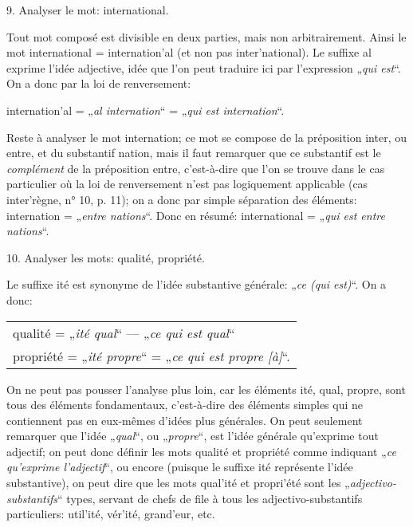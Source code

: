 {    9. Analyser le mot: \textup{international}.

    Tout mot composé est divisible en deux parties, mais non
    arbitrairement. Ainsi le mot \textup{international} = \textup{
      internation’al} (et non pas \textup{inter’national}). Le suffixe
    \textup{al} exprime l’idée adjective, idée que l’on peut traduire ici par
    l’expression „\emph{qui est}“. On a donc par la loi de renversement:

    {\centering
      \textup{internation’al} = „\emph{al internation}“ = „\emph{qui
        est internation}“.
      \par}
    \noindent
    Reste à analyser le mot \textup{internation}; ce mot se compose de
    la préposition \textup{inter}, ou \textup{entre}, et du substantif
    \textup{nation}, mais il faut remarquer que ce substantif est le
    \emph{complément} de la préposition \textup{entre}, c’est-à-dire
    que l’on se trouve dans le cas particulier où la loi de
    renversement n’est pas logiquement applicable (cas
    \textup{inter'règne}, n° 10, p. 11); on a donc par simple
    séparation des éléments: \textup{internation} = „\emph{entre
      nations}“. Donc en résumé: \textup{international} = „\emph{qui
      est entre nations}“.

    10. Analyser les mots: \textup{qualité}, \textup{propriété}.

    Le suffixe \textup{ité} est synonyme de l’idée substantive
    générale: „\emph{ce (qui est)}“. On a donc:

    {\centering
      \begin{tabular}[t]{l}
        \textup{qualité} = „\emph{ité qual}“ — „\emph{ce qui est
        qual}“\\
        \textup{propriété} = „\emph{ité propre}“ = „\emph{ce qui est propre [à]}“.
      \end{tabular}
      \par}


    On ne peut pas pousser l’analyse plus loin, car les éléments
    \textup{ité}, \textup{qual}, \textup{propre}, sont tous des
    éléments fondamentaux, c’est-à-dire des éléments simples qui ne
    contiennent pas en eux-mêmes d’idées plus générales. On peut
    seulement remarquer que l’idée „\emph{qual}“, ou „\emph{propre}“,
    est l’idée générale qu’exprime tout adjectif; on peut donc définir
    les mots \textup{qualité} et \textup{propriété} comme indiquant
    „\emph{ce qu'exprime l'adjectif}“, ou encore (puisque le suffixe
    \textup{ité} représente l’idée substantive), on peut dire que les
    mots \textup{qual'ité} et \textup{propri'été} sont les
    „\emph{adjectivo-substantifs}“ types, servant de chefs de file à
    tous les adjectivo-substantifs particuliers: \textup{util'ité},
    \textup{vér’ité}, \textup{grand'eur}, etc.
  }
  
